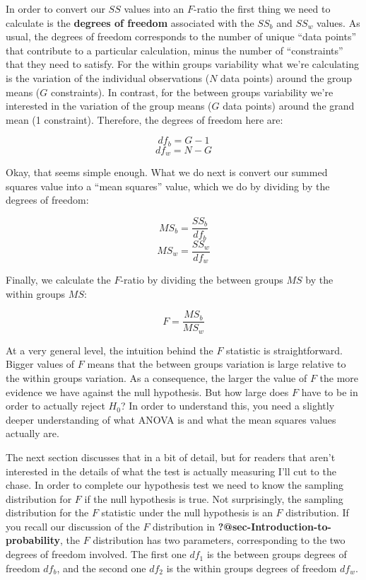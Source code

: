 \documentclass[
  a4paper,
]{book}
\begin{document}
In order to convert our \(SS\) values into an \(F\)-ratio the first
thing we need to calculate is the \textbf{degrees of freedom} associated
with the \(SS_b\) and \(SS_w\) values. As usual, the degrees of freedom
corresponds to the number of unique ``data points'' that contribute to a
particular calculation, minus the number of ``constraints'' that they
need to satisfy. For the within groups variability what we're
calculating is the variation of the individual observations (\(N\) data
points) around the group means (\(G\) constraints). In contrast, for the
between groups variability we're interested in the variation of the
group means (\(G\) data points) around the grand mean (1 constraint).
Therefore, the degrees of freedom here are:

\[df_b=G-1\] \[df_w=N-G\]

Okay, that seems simple enough. What we do next is convert our summed
squares value into a ``mean squares'' value, which we do by dividing by
the degrees of freedom:

\[MS_b=\frac{SS_b}{df_b}\] \[MS_w=\frac{SS_w}{df_w}\]

Finally, we calculate the \(F\)-ratio by dividing the between groups
\(MS\) by the within groups \(MS\):

\[F=\frac{MS_b}{MS_w}\]

At a very general level, the intuition behind the \(F\) statistic is
straightforward. Bigger values of \(F\) means that the between groups
variation is large relative to the within groups variation. As a
consequence, the larger the value of \(F\) the more evidence we have
against the null hypothesis. But how large does \(F\) have to be in
order to actually reject \(H_0\)? In order to understand this, you need
a slightly deeper understanding of what ANOVA is and what the mean
squares values actually are.

The next section discusses that in a bit of detail, but for readers that
aren't interested in the details of what the test is actually measuring
I'll cut to the chase. In order to complete our hypothesis test we need
to know the sampling distribution for \(F\) if the null hypothesis is
true. Not surprisingly, the sampling distribution for the \(F\)
statistic under the null hypothesis is an \(F\) distribution. If you
recall our discussion of the \(F\) distribution in
\textbf{?@sec-Introduction-to-probability}, the \(F\) distribution has
two parameters, corresponding to the two degrees of freedom involved.
The first one \(df_1\) is the between groups degrees of freedom
\(df_b\), and the second one \(df_2\) is the within groups degrees of
freedom \(df_w\).
\end{document}
